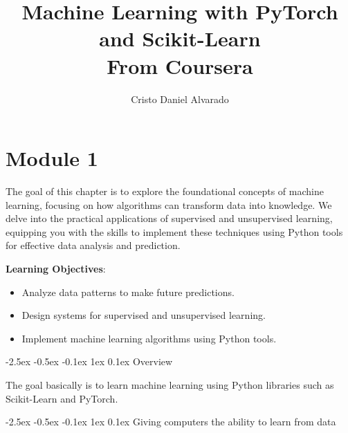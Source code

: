 \documentclass[12pt]{report}
\makeatletter
\renewcommand{\section}{\@startsection{section}{1}{\z@}%
  {-2.5ex \@plus -0.5ex \@minus -0.1ex}%
  {1ex \@plus 0.1ex}%
  {\normalfont\Large\sectionstyle}}
\newcommand{\sectionstyle}[1]{%
  \par\noindent\hrule
  \vspace{0.2ex}%
  {\scshape{#1}\par}%
  \vspace{0.4ex}%
  \hrule
}
\theoremstyle{largebreak}
\makeatother
\begin{document}
    \setlength{\parskip}{5pt}
    \setlength{\parindent}{12pt}
    \title{Machine Learning with PyTorch and Scikit-Learn\\
    
    From Coursera}
    \author{Cristo Daniel Alvarado}
    \maketitle

    \tableofcontents

    \lstlistoflistings

    \newpage

    \chapter{Module 1}

    The goal of this chapter is to explore the foundational concepts of machine learning, focusing on how algorithms can transform data into knowledge. We delve into the practical applications of supervised and unsupervised learning, equipping you with the skills to implement these techniques using Python tools for effective data analysis and prediction.
    
    \begin{obs}
        \textbf{Learning Objectives}:
        \begin{itemize}
            \item Analyze data patterns to make future predictions.
            \item Design systems for supervised and unsupervised learning.
            \item Implement machine learning algorithms using Python tools.
        \end{itemize}
    \end{obs}
        
    \section{Overview}

    The goal basically is to learn machine learning using Python libraries such as Scikit-Learn and PyTorch.

    \section{Giving computers the ability to learn from data}
\end{document}

